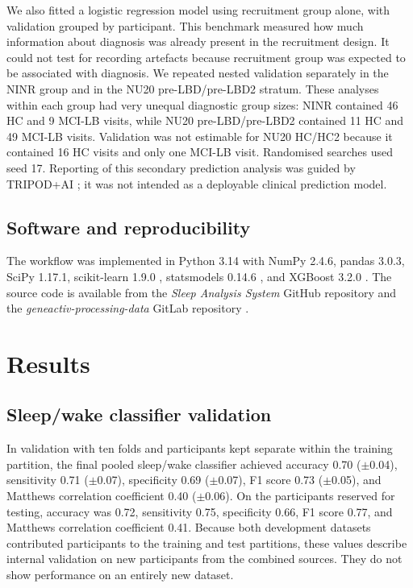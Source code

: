 \documentclass[referee,pdflatex,sn-vancouver-num]{sn-jnl}
\begin{document}
We also fitted a logistic regression model using recruitment group alone,
with validation grouped by participant. This benchmark measured how much
information about diagnosis was already present in the recruitment design.
It could not test for recording artefacts because recruitment group was
expected to be associated with diagnosis. We repeated nested validation separately in the NINR group
and in the NU20 pre-LBD/pre-LBD2 stratum. These
analyses within each group had very unequal diagnostic group sizes:
NINR contained 46 HC and 9 MCI-LB visits, while NU20 pre-LBD/pre-LBD2 contained
11 HC and 49 MCI-LB visits. Validation was not estimable for NU20 HC/HC2 because
it contained 16 HC visits and only one MCI-LB visit. Randomised searches used
seed 17. Reporting of this secondary prediction analysis was guided by
TRIPOD+AI \cite{collins2024tripodai}; it was not intended as a deployable
clinical prediction model.

\subsection{Software and reproducibility}\label{subsec:software}

The workflow was implemented in Python 3.14 with NumPy 2.4.6, pandas 3.0.3,
SciPy 1.17.1, scikit-learn 1.9.0 \cite{pedregosa2011scikitlearn}, statsmodels
0.14.6 \cite{seabold2010statsmodels}, and XGBoost 3.2.0
\cite{chen2016xgboost}. The source code is available from the \textit{Sleep
Analysis System} GitHub repository and the \textit{geneactiv-processing-data}
GitLab repository \cite{bdalab2026sleepanalysis,mikulec2026geneactiv}.

\section{Results}\label{sec:results}

\subsection{Sleep/wake classifier validation}\label{subsec:sleep-model-results}

In validation with ten folds and participants kept separate within the training partition, the
final pooled sleep/wake classifier achieved accuracy 0.70 ($\pm$0.04),
sensitivity 0.71 ($\pm$0.07), specificity 0.69 ($\pm$0.07), F1 score 0.73
($\pm$0.05), and Matthews correlation coefficient 0.40 ($\pm$0.06). On the
participants reserved for testing, accuracy was 0.72, sensitivity 0.75, specificity
0.66, F1 score 0.77, and Matthews correlation coefficient 0.41. Because both
development datasets contributed participants to the training and test
partitions, these values describe internal validation on new participants from
the combined sources. They do not show performance on an entirely new dataset.
\end{document}
